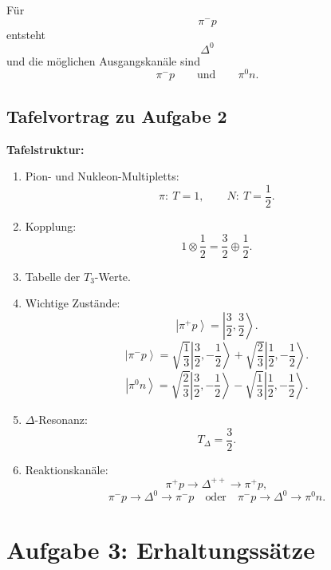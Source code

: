 \documentclass[11pt,a4paper]{scrartcl}
\newcommand{\ket}[1]{\left| #1 \right\rangle}
\theoremstyle{definition}
\theoremstyle{plain}
\theoremstyle{remark}
\begin{document}
\begin{enumerate}[label=(\alph*)]
\begin{answerbox}
        Für
        \[
            \boxed{\pi^-p}
        \]
        entsteht
        \[
            \boxed{\Delta^0}
        \]
        und die möglichen Ausgangskanäle sind
        \[
            \boxed{\pi^-p}
            \qquad\text{und}\qquad
            \boxed{\pi^0n}.
        \]
    \end{answerbox}
\end{enumerate}

\subsection{Tafelvortrag zu Aufgabe 2}

\begin{talkbox}
\textbf{Tafelstruktur:}
\begin{enumerate}
    \item Pion- und Nukleon-Multipletts:
    \[
        \pi:\ T=1,
        \qquad
        N:\ T=\frac12.
    \]
    \item Kopplung:
    \[
        1\otimes\frac12=\frac32\oplus\frac12.
    \]
    \item Tabelle der $T_3$-Werte.
    \item Wichtige Zustände:
    \[
        \ket{\pi^+p}=\ket{\frac32,\frac32}.
    \]
    \[
        \ket{\pi^-p}
        =
        \sqrt{\frac13}\ket{\frac32,-\frac12}
        +
        \sqrt{\frac23}\ket{\frac12,-\frac12}.
    \]
    \[
        \ket{\pi^0n}
        =
        \sqrt{\frac23}\ket{\frac32,-\frac12}
        -
        \sqrt{\frac13}\ket{\frac12,-\frac12}.
    \]
    \item $\Delta$-Resonanz:
    \[
        T_\Delta=\frac32.
    \]
    \item Reaktionskanäle:
    \[
        \pi^+p\to\Delta^{++}\to\pi^+p,
    \]
    \[
        \pi^-p\to\Delta^0\to\pi^-p
        \quad\text{oder}\quad
        \pi^-p\to\Delta^0\to\pi^0n.
    \]
\end{enumerate}
\end{talkbox}

\FloatBarrier
\newpage

\section{Aufgabe 3: Erhaltungss\"atze}
\end{document}
